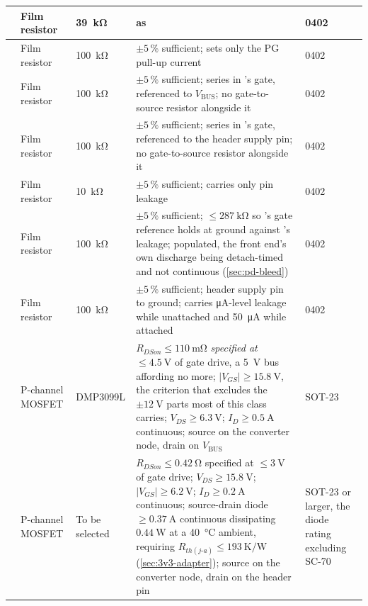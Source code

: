 {\begin{longtable}{|L{0.10\textwidth}|L{0.14\textwidth}|L{0.11\textwidth}|L{0.33\textwidth}|L{0.12\textwidth}|}
\hline
{} & Film resistor & \SI{39}{\kilo\ohm} & as  & 0402 \\
\hline
{} & Film resistor & \SI{100}{\kilo\ohm} & $\pm5\,\%$ sufficient; sets only the PG pull-up current & 0402 \\
\hline
{} & Film resistor & \SI{100}{\kilo\ohm} & $\pm5\,\%$ sufficient; series in 's gate, referenced to $V_{\mathrm{BUS}}$; no gate-to-source resistor alongside it & 0402 \\
\hline
{} & Film resistor & \SI{100}{\kilo\ohm} & $\pm5\,\%$ sufficient; series in 's gate, referenced to the header supply pin; no gate-to-source resistor alongside it & 0402 \\
\hline
{} & Film resistor & \SI{10}{\kilo\ohm} & $\pm5\,\%$ sufficient; carries only pin leakage & 0402 \\
\hline
{} & Film resistor & \SI{100}{\kilo\ohm} & $\pm5\,\%$ sufficient; $\leq\SI{287}{\kilo\ohm}$ so 's gate reference holds at ground against 's leakage; populated, the front end's own discharge being detach-timed and not continuous (\cref{sec:pd-bleed}) & 0402 \\
\hline
{} & Film resistor & \SI{100}{\kilo\ohm} & $\pm5\,\%$ sufficient; header supply pin to ground; carries \si{\micro\ampere}-level leakage while unattached and \SI{50}{\micro\ampere} while attached & 0402 \\
\hline
{} & P-channel MOSFET & DMP3099L & $R_{DSon}\leq\SI{110}{\milli\ohm}$ \emph{specified at} $\leq\SI{4.5}{\volt}$ of gate drive, a \SI{5}{\volt} bus affording no more; $|V_{GS}|\geq\SI{15.8}{\volt}$, the criterion that excludes the $\pm\SI{12}{\volt}$ parts most of this class carries; $V_{DS}\geq\SI{6.3}{\volt}$; $I_D\geq\SI{0.5}{\ampere}$ continuous; source on the converter node, drain on $V_{\mathrm{BUS}}$ & SOT-23 \\
\hline
{} & P-channel MOSFET & To be selected & $R_{DSon}\leq\SI{0.42}{\ohm}$ specified at $\leq\SI{3}{\volt}$ of gate drive; $V_{DS}\geq\SI{15.8}{\volt}$; $|V_{GS}|\geq\SI{6.2}{\volt}$; $I_D\geq\SI{0.2}{\ampere}$ continuous; source-drain diode $\geq\SI{0.37}{\ampere}$ continuous dissipating $\SI{0.44}{\watt}$ at a \SI{40}{\celsius} ambient, requiring $R_{th(j\text{-}a)}\leq\SI{193}{\kelvin\per\watt}$ (\cref{sec:3v3-adapter}); source on the converter node, drain on the header pin & SOT-23 or larger, the diode rating excluding SC-70 \\
\hline
\end{longtable}
}
